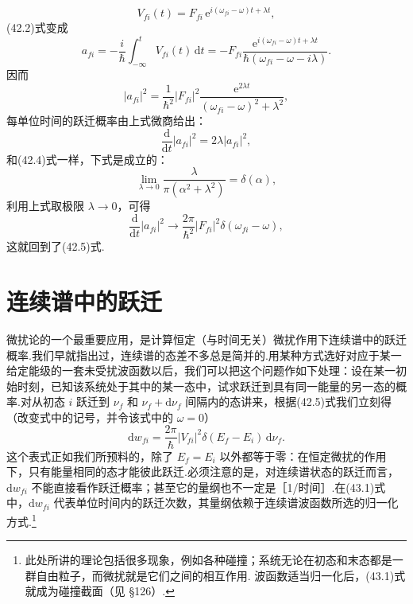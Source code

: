 \begin{equation*}
  V_{fi}(t)=F_{fi}\,\mathrm{e}^{i(\omega_{fi}-\omega)t+\lambda t},
\end{equation*}
(42.2)式变成
\begin{equation}
  a_{fi}=-\frac{i}{\hbar}\int_{-\infty}^{t}V_{fi}(t)\,\mathrm{d}t
  =-F_{fi}\frac{\mathrm{e}^{i(\omega_{fi}-\omega)t+\lambda t}}
  {\hbar\left(\omega_{fi}-\omega-i\lambda\right)}.
\end{equation}
因而
\begin{equation*}
  |a_{fi}|^2=\frac{1}{\hbar^2}|F_{fi}|^2
  \frac{\mathrm{e}^{2\lambda t}}{\left(\omega_{fi}-\omega\right)^2+\lambda^2},
\end{equation*}
每单位时间的跃迁概率由上式微商给出：
\begin{equation*}
  \frac{\mathrm{d}}{\mathrm{d}t}|a_{fi}|^2=2\lambda|a_{fi}|^2,
\end{equation*}
和(42.4)式一样，下式是成立的：
\begin{equation}
  \lim_{\lambda\to0}\frac{\lambda}{\pi\left(\alpha^2+\lambda^2\right)}=\delta(\alpha),
\end{equation}
利用上式取极限 $\lambda\to0$，可得
\begin{equation*}
  \frac{\mathrm{d}}{\mathrm{d}t}|a_{fi}|^2\longrightarrow
  \frac{2\pi}{\hbar^2}|F_{fi}|^2\delta(\omega_{fi}-\omega),
\end{equation*}
这就回到了(42.5)式.

\section{连续谱中的跃迁}

微扰论的一个最重要应用，是计算恒定（与时间无关）微扰作用下连续谱中的跃迁概率.我们早就指出过，连续谱的态差不多总是简并的.用某种方式选好对应于某一给定能级的一套未受扰波函数以后，我们可以把这个问题作如下处理：设在某一初始时刻，已知该系统处于其中的某一态中，试求跃迁到具有同一能量的另一态的概率.对从初态 $i$ 跃迁到 $\nu_f$ 和 $\nu_f+\mathrm{d}\nu_f$ 间隔内的态讲来，根据(42.5)式我们立刻得（改变式中的记号，并令该式中的 $\omega=0$）
\begin{equation}
  \mathrm{d}w_{fi}=\frac{2\pi}{\hbar}|V_{fi}|^2\delta(E_f-E_i)\,\mathrm{d}\nu_f.
\end{equation}
这个表式正如我们所预料的，除了 $E_f=E_i$ 以外都等于零：在恒定微扰的作用下，只有能量相同的态才能彼此跃迁.必须注意的是，对连续谱状态的跃迁而言，$\mathrm{d}w_{fi}$ 不能直接看作跃迁概率；甚至它的量纲也不一定是［1/时间］.在(43.1)式中，$\mathrm{d}w_{fi}$ 代表单位时间内的跃迁次数，其量纲依赖于连续谱波函数所选的归一化方式.\footnote{此处所讲的理论包括很多现象，例如各种碰撞；系统无论在初态和末态都是一群自由粒子，而微扰就是它们之间的相互作用. 波函数适当归一化后，(43.1)式就成为碰撞截面（见 §126）.}

